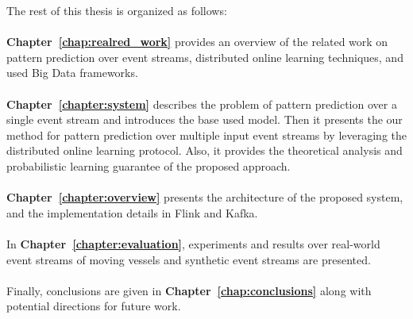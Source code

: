 \par The rest of this thesis is organized as follows:\\
\\
\textbf{Chapter~\ref{chap:realred_work}} provides an overview of the related work on pattern prediction over event streams, distributed online learning techniques, and used Big Data frameworks.
\\
\\
\textbf{Chapter~\ref{chapter:system}} describes the problem of  pattern prediction over a single event stream and introduces the base used model. Then it presents the our method for pattern prediction over multiple input event streams by leveraging the distributed online learning protocol. Also, it provides the theoretical analysis and probabilistic learning guarantee of the proposed approach.  
\\
\\
\textbf{Chapter~\ref{chapter:overview}}  presents the architecture of the proposed system, and the implementation details in Flink and Kafka.
\\
\\
In \textbf{Chapter~\ref{chapter:evaluation}}, experiments and results over real-world event streams of moving vessels and synthetic event streams are presented.
\\
\\
Finally, conclusions are given in \textbf{Chapter~\ref{chap:conclusions}} along with potential directions for future work.







